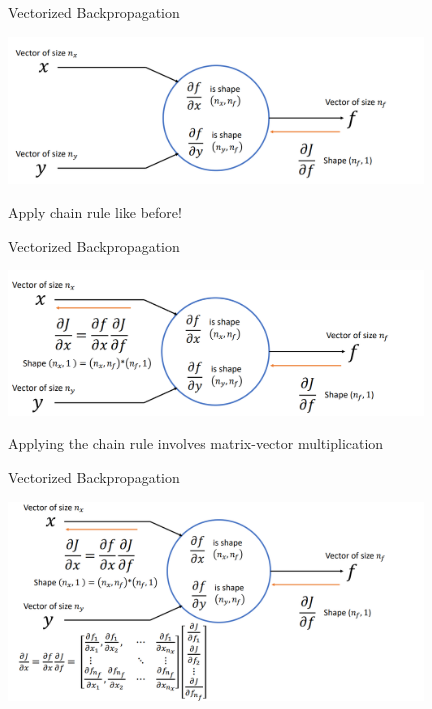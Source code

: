 \documentclass[serif, aspectratio=169]{beamer}
\begin{document}
\begin{frame}{Vectorized Backpropagation}

    \begin{center}
        \includegraphics[width=11cm]{pic/vec5.png}  
    \end{center}
    Apply chain rule like before!
\end{frame}

\begin{frame}{Vectorized Backpropagation}
    \begin{center}
        \includegraphics[width=11cm]{pic/vec6.png}  
    \end{center}
    Applying the chain rule involves matrix-vector multiplication
\end{frame}

\begin{frame}{Vectorized Backpropagation}
    \begin{center}
        \includegraphics[width=11cm]{pic/chain10.png}  
    \end{center}
\end{frame}
\end{document}
